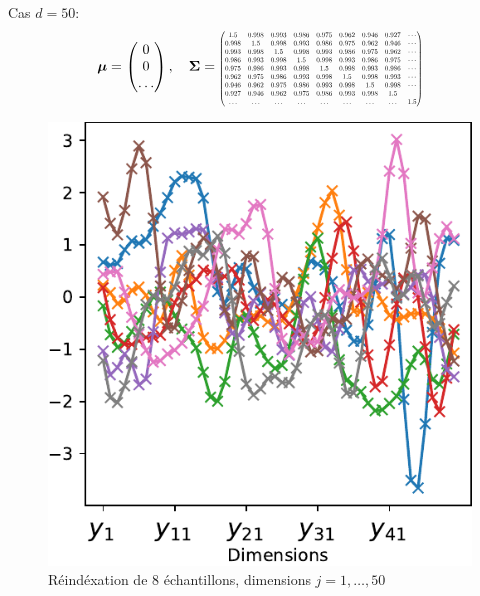 \documentclass[xcolor=svgnames, t]{beamer}
\newcommand{\vectorx}[1]{\boldsymbol{\MakeLowercase{\mathbf{#1}}}}
\newcommand{\matrixx}[1]{\boldsymbol{\MakeUppercase{#1}}}
\newcommand{\scalemath}[2]{\scalebox{#1}{\mbox{\ensuremath{\displaystyle #2}}}}
\begin{document}
\begin{frame}{\subsecname}
  Cas $d=50$:%
  \begin{equation*}
    \vectorx{\mu}
    =
    \begin{pmatrix}
      0 \\
      0 \\
      \dots
    \end{pmatrix},
    \quad
    \matrixx{\Sigma}
    =
    \scalemath{0.5}{
      \begin{pmatrix}
        1.5 & 0.998 & 0.993 & 0.986 & 0.975 & 0.962 & 0.946 & 0.927 & \cdots \\
        0.998 & 1.5 & 0.998 & 0.993 & 0.986 & 0.975 & 0.962 & 0.946 & \cdots \\
        0.993 & 0.998 & 1.5 & 0.998 & 0.993 & 0.986 & 0.975 & 0.962 & \cdots \\
        0.986 & 0.993 & 0.998 & 1.5 & 0.998 & 0.993 & 0.986 & 0.975 & \cdots \\
        0.975 & 0.986 & 0.993 & 0.998 & 1.5 & 0.998 & 0.993 & 0.986 & \cdots \\
        0.962 & 0.975 & 0.986 & 0.993 & 0.998 & 1.5 & 0.998 & 0.993 & \cdots \\
        0.946 & 0.962 & 0.975 & 0.986 & 0.993 & 0.998 & 1.5 & 0.998 & \cdots \\
        0.927 & 0.946 & 0.962 & 0.975 & 0.986 & 0.993 & 0.998 & 1.5   \\
        \hdots & \hdots & \hdots & \hdots & \hdots & \hdots & \hdots & \hdots & 1.5
      \end{pmatrix}
    }
  \end{equation*}%
  \begin{figure}[h]
    \includegraphics[scale=0.4]{gaussian_50d_valuevsindex.pdf}%
    \caption{Réindéxation de $8$ échantillons, dimensions $j=1, \dots, 50$}
  \end{figure}
\end{frame}
%
\end{document}
